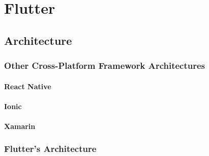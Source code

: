 \chapter{Flutter}

\section{Architecture}

\subsection{Other Cross-Platform Framework Architectures}

\subsubsection{React Native}

\subsubsection{Ionic}

\subsubsection{Xamarin}


\subsection{Flutter's Architecture}